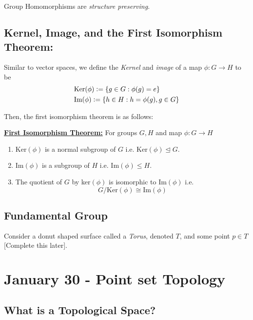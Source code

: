 \documentclass{article}
\newcommand{\defeq}{\vcentcolon=}
\begin{document}
\vskip 0.5cm
Group Homomorphisms are \emph{structure preserving}.


\vskip 1cm
\subsection{Kernel, Image, and the First Isomorphism Theorem:}

Similar to vector spaces, we define the \emph{Kernel} and \emph{image} of a map $\phi : G \rightarrow H$ to be 
\begin{align*}
  &\text{Ker}(\phi) \defeq \{ g \in G : \phi(g) = e \} \\
  &\text{Im}(\phi) \defeq \{ h \in H : h = \phi(g), g \in G \} 
\end{align*}

Then, the first isomorphism theorem is as follows:

\vskip 0.5cm
\begin{dottedbox}
  \underline{\textbf{First Isomorphism Theorem:}} For groups $G, H$ and map $\phi : G \rightarrow H$
  \begin{enumerate}[label=(\alph*)]
    \item Ker$(\phi)$ is a normal subgroup of $G$ i.e. Ker$(\phi) \trianglelefteq G$.
    \item Im$(\phi)$ is a subgroup of $H$ i.e. Im$(\phi) \leq H$.
    \item The quotient of $G$ by ker$(\phi)$ is isomorphic to Im$(\phi)$ i.e.
    \[ G / \text{Ker}(\phi) \cong \text{Im}(\phi) \]
  \end{enumerate}
\end{dottedbox}

\vskip 1cm
\subsection{Fundamental Group}

Consider a donut shaped surface called a \emph{Torus}, denoted $T$, and some point $p \in T$ [Complete this later].

\pagebreak
\section{January 30 - Point set Topology}

\vskip 0.5cm
\subsection{What is a Topological Space?}
\end{document}
